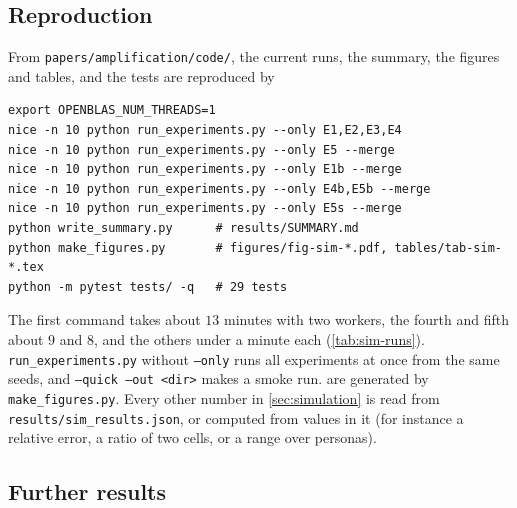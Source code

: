 \subsection{Reproduction}\label{app:sim-repro}

From \texttt{papers/amplification/code/}, the current runs, the summary, the figures and tables, and the tests are reproduced by
\begin{verbatim}
export OPENBLAS_NUM_THREADS=1
nice -n 10 python run_experiments.py --only E1,E2,E3,E4
nice -n 10 python run_experiments.py --only E5 --merge
nice -n 10 python run_experiments.py --only E1b --merge
nice -n 10 python run_experiments.py --only E4b,E5b --merge
nice -n 10 python run_experiments.py --only E5s --merge
python write_summary.py      # results/SUMMARY.md
python make_figures.py       # figures/fig-sim-*.pdf, tables/tab-sim-*.tex
python -m pytest tests/ -q   # 29 tests
\end{verbatim}
The first command takes about $13$ minutes with two workers, the fourth and fifth about $9$ and $8$, and the others under a minute each (\cref{tab:sim-runs}). \texttt{run\_experiments.py} without \texttt{--only} runs all experiments at once from the same seeds, and \texttt{--quick --out <dir>} makes a smoke run.  are generated by \texttt{make\_figures.py}. Every other number in \cref{sec:simulation} is read from \texttt{results/sim\_results.json}, or computed from values in it (for instance a relative error, a ratio of two cells, or a range over personas).

\subsection{Further results}\label{app:sim-further}

